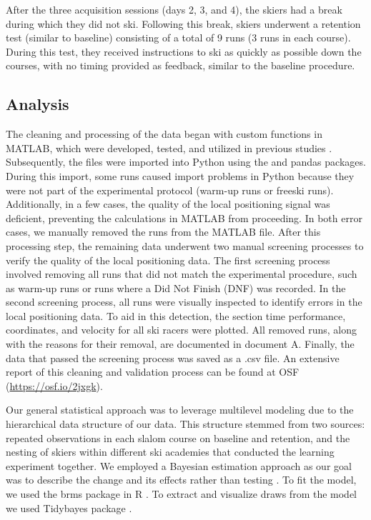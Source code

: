 \documentclass{article}
\begin{document}
After the three acquisition sessions (days 2, 3, and 4), the skiers had a break during which they did not ski. Following this break, skiers underwent a retention test (similar to baseline) consisting of a total of 9 runs (3 runs in each course). During this test, they received instructions to ski as quickly as possible down the courses, with no timing provided as feedback, similar to the baseline procedure.


\subsection{Analysis}
The cleaning and processing of the data began with custom functions in MATLAB, which were developed, tested, and utilized in previous studies \cite{reidKinematicKineticStudy2010}. Subsequently, the files were imported into Python using the \cite{2020SciPy-NMeth} and pandas \cite{reback2020pandas} packages. During this import, some runs caused import problems in Python because they were not part of the experimental protocol (warm-up runs or freeski runs).
Additionally, in a few cases, the quality of the local positioning signal was deficient, preventing the calculations in MATLAB from proceeding. In both error cases, we manually removed the runs from the MATLAB file. After this processing step, the remaining data underwent two manual screening processes to verify the quality of the local positioning data. The first screening process involved removing all runs that did not match the experimental procedure, such as warm-up runs or runs where a Did Not Finish (DNF) was recorded. In the second screening process, all runs were visually inspected to identify errors in the local positioning data. To aid in this detection, the section time performance, coordinates, and velocity for all ski racers were plotted. All removed runs, along with the reasons for their removal, are documented in document A. Finally, the data that passed the screening process was saved as a .csv file. An extensive report of this cleaning and validation process can be found at OSF  (\url{https://osf.io/2jxgk}).

Our general statistical approach was to leverage multilevel modeling due to the hierarchical data structure of our data. This structure stemmed from two sources: repeated observations in each slalom course on baseline and retention, and the nesting of skiers within different ski academies that conducted the learning experiment together. We employed a Bayesian estimation approach as our goal was to describe the change and its effects rather than testing \cite{kruschke_bayesian_2018}. To fit the model, we used the brms \cite{burkner_brms_2017} package in R \cite{r_core_team_r_2022}. To extract and visualize draws from the model we used Tidybayes package \cite{kay_tidybayes_nodate}. 
\end{document}
